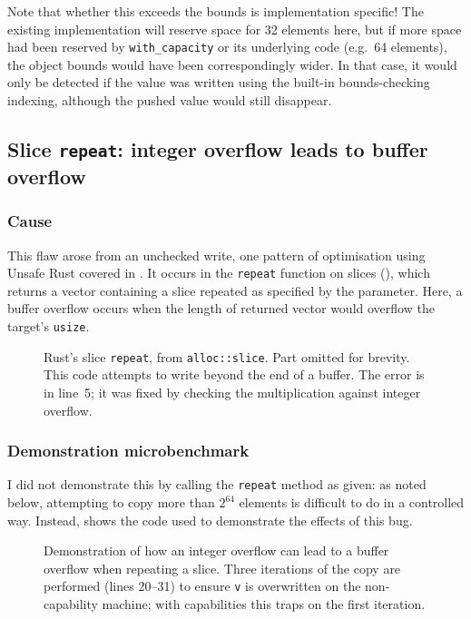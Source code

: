 \documentclass[dissertation.tex]{subfiles}
\begin{document}
Note that whether this exceeds the bounds is implementation specific!
The existing implementation will reserve space for 32 elements here, but
if more space had been reserved by \texttt{with\_capacity} or its
underlying code (e.g.\ 64 elements), the object bounds would have been
correspondingly wider.
In that case, it would only be detected if the value was written using
the built-in bounds-checking indexing, although the pushed value would
still disappear.


\subsection{Slice \texttt{repeat}: integer overflow leads to buffer overflow}
\label{sec:eval-micro-repeat}

\subsubsection{Cause}
This flaw arose from an unchecked write, one pattern of optimisation
using Unsafe Rust covered in .
It occurs in the \texttt{repeat} function on slices
(), which returns a vector containing a slice
repeated as specified by the parameter.
Here, a buffer overflow occurs when the length of returned vector would
overflow the target's \texttt{usize}.

\begin{figure}[ht]
    
    \caption{
        Rust's slice \texttt{repeat}, from \texttt{alloc::slice}.
        Part omitted for brevity.
        This code attempts to write beyond the end of a buffer.
        The error is in line~5; it was fixed by checking the
        multiplication against integer overflow.
    }
    \label{lst:slice-repeat}
\end{figure}

\subsubsection{Demonstration microbenchmark}
I did not demonstrate this by calling the \texttt{repeat} method as
given: as noted below, attempting to copy more than \(2^{64}\) elements
is difficult to do in a controlled way.
Instead,  shows the code used to demonstrate the
effects of this bug.

\begin{figure}[ht]
    
    \caption{
        Demonstration of how an integer overflow can lead to a buffer
        overflow when repeating a slice.
        Three iterations of the copy are performed (lines 20--31) to
        ensure \texttt{v} is overwritten on the non-capability machine;
        with capabilities this traps on the first iteration.
    }
    \label{lst:micro-repeat}
\end{figure}
\end{document}
